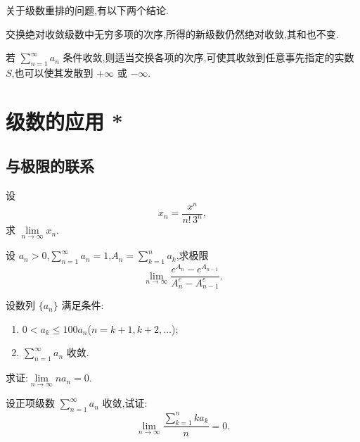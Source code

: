 \documentclass[../../数学分析培优讲义.tex]{subfiles}
\begin{document}
关于级数重排的问题,有以下两个结论.

\begin{theorem}[\markstar]
交换绝对收敛级数中无穷多项的次序,所得的新级数仍然绝对收敛,其和也不变.
\end{theorem}

\begin{theorem}
若 $\displaystyle\sum\limits_{n=1}^{\infty}a_n$ 条件收敛,则适当交换各项的次序,可使其收敛到任意事先指定的实数 $S$,也可以使其发散到 $+\infty$ 或 $-\infty$.
\end{theorem}


\newpage

\section{级数的应用 *}


\subsection{与极限的联系}

\begin{example}
设
\[
    x_n=\dfrac{x^n}{n!\,3^n},
\]
求 $\displaystyle\lim\limits_{n\to\infty}x_n$.
\end{example}
\exampleblank

\begin{example}
设 $a_n>0$,$\displaystyle\sum\limits_{n=1}^{\infty}a_n=1$,$\displaystyle A_n=\sum\limits_{k=1}^na_k$,求极限
\[
    \lim\limits_{n\to\infty}\dfrac{e^{A_n}-e^{A_{n-1}}}{A_n^e-A_{n-1}^e}.
\]
\end{example}
\exampleblank

\begin{example}
设数列 $\{a_n\}$ 满足条件:
\begin{enumerate}[label=(\arabic*)]
    \item $0<a_k\leq100a_n$($n=k+1,k+2,\ldots$);
    \item $\displaystyle\sum\limits_{n=1}^{\infty}a_n$ 收敛.
\end{enumerate}
求证:$\displaystyle\lim\limits_{n\to\infty}na_n=0$.
\end{example}
\exampleblank

\begin{example}[\markstar]
设正项级数 $\displaystyle\sum\limits_{n=1}^{\infty}a_n$ 收敛,试证:
\[
    \lim\limits_{n\to\infty}\dfrac{\sum\limits_{k=1}^nka_k}{n}=0.
\]
\end{example}
\exampleblank
\end{document}
